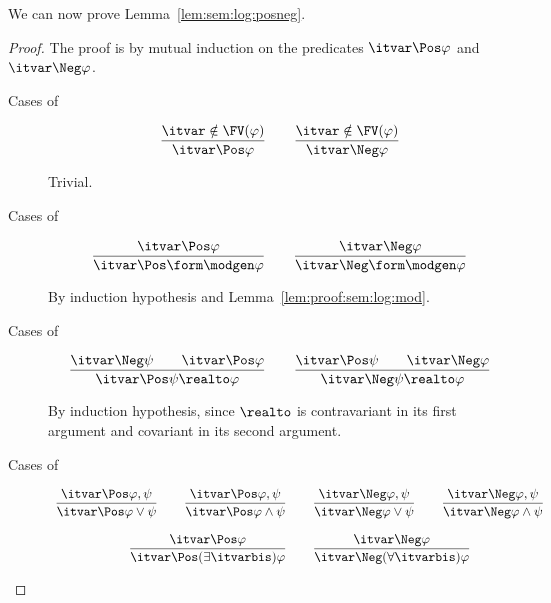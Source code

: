 We can now prove Lemma~\ref{lem:sem:log:posneg}.

\LemPosNeg*

\begin{proof}
The proof is by mutual induction on the predicates
$\itvar \Pos \varphi$ and $\itvar \Neg \varphi$.
\begin{description}
\item[Cases of]
\[
\begin{array}{c}
%
\dfrac{\itvar \notin \FV(\varphi)}
  {\itvar \Pos \varphi}
%
\qquad
%
\dfrac{\itvar \notin \FV(\varphi)}
  {\itvar \Neg \varphi}
%
\end{array}
\]

Trivial.

\item[Cases of]
\[
\begin{array}{c}
%
\dfrac{\itvar \Pos \varphi}
  {\itvar \Pos \form\modgen \varphi}
%
\qquad
%
\dfrac{\itvar \Neg \varphi}
  {\itvar \Neg \form\modgen \varphi}
%
\end{array}
\]

By induction hypothesis and Lemma~\ref{lem:proof:sem:log:mod}.

\item[Cases of]
\[
\begin{array}{c}
%
\dfrac{\itvar \Neg \psi
  \qquad
  \itvar \Pos \varphi}
  {\itvar \Pos \psi \realto \varphi}
%
\qquad
%
\dfrac{\itvar \Pos \psi
  \qquad
  \itvar \Neg \varphi}
  {\itvar \Neg \psi \realto \varphi}
%
\end{array}
\]

By induction hypothesis, since $\realto$ is contravariant
in its first argument and covariant in its second argument.

\item[Cases of]
\[
\begin{array}{c}
%
\dfrac{\itvar \Pos \varphi, \psi}
  {\itvar \Pos \varphi \lor \psi}
%
\qquad
%
\dfrac{\itvar \Pos \varphi, \psi}
  {\itvar \Pos \varphi \land \psi}
%
\qquad
%
\dfrac{\itvar \Neg \varphi, \psi}
  {\itvar \Neg \varphi \lor \psi}
%
\qquad
%
\dfrac{\itvar \Neg \varphi, \psi}
  {\itvar \Neg \varphi \land \psi}
%
\\\\
%
\dfrac{\itvar \Pos \varphi}
  {\itvar \Pos (\exists \itvarbis)\varphi}
%
\qquad
%
\dfrac{\itvar \Neg \varphi}
  {\itvar \Neg (\forall \itvarbis)\varphi}
%
\end{array}
\]


\end{description}
\end{proof}
